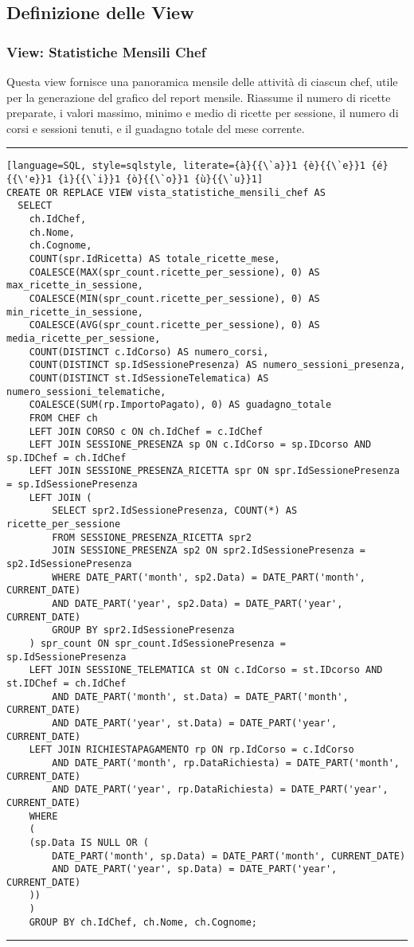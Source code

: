 \subsection{Definizione delle View}

\subsubsection{View: Statistiche Mensili Chef}

Questa view fornisce una panoramica mensile delle attività di ciascun chef, utile per la generazione del grafico del report mensile. Riassume il numero di ricette preparate, i valori massimo, minimo e medio di ricette per sessione, il numero di corsi e sessioni tenuti, e il guadagno totale del mese corrente.

\noindent\rule{\textwidth}{0.4pt}
\begin{lstlisting}[language=SQL, style=sqlstyle, literate={à}{{\`a}}1 {è}{{\`e}}1 {é}{{\'e}}1 {ì}{{\`i}}1 {ò}{{\`o}}1 {ù}{{\`u}}1]
CREATE OR REPLACE VIEW vista_statistiche_mensili_chef AS
  SELECT
    ch.IdChef,
    ch.Nome,
    ch.Cognome,
    COUNT(spr.IdRicetta) AS totale_ricette_mese,
    COALESCE(MAX(spr_count.ricette_per_sessione), 0) AS max_ricette_in_sessione,
    COALESCE(MIN(spr_count.ricette_per_sessione), 0) AS min_ricette_in_sessione,
    COALESCE(AVG(spr_count.ricette_per_sessione), 0) AS media_ricette_per_sessione,
    COUNT(DISTINCT c.IdCorso) AS numero_corsi,
    COUNT(DISTINCT sp.IdSessionePresenza) AS numero_sessioni_presenza,
    COUNT(DISTINCT st.IdSessioneTelematica) AS numero_sessioni_telematiche,
    COALESCE(SUM(rp.ImportoPagato), 0) AS guadagno_totale
    FROM CHEF ch
    LEFT JOIN CORSO c ON ch.IdChef = c.IdChef
    LEFT JOIN SESSIONE_PRESENZA sp ON c.IdCorso = sp.IDcorso AND sp.IDChef = ch.IdChef
    LEFT JOIN SESSIONE_PRESENZA_RICETTA spr ON spr.IdSessionePresenza = sp.IdSessionePresenza
    LEFT JOIN (
        SELECT spr2.IdSessionePresenza, COUNT(*) AS ricette_per_sessione
        FROM SESSIONE_PRESENZA_RICETTA spr2
        JOIN SESSIONE_PRESENZA sp2 ON spr2.IdSessionePresenza = sp2.IdSessionePresenza
        WHERE DATE_PART('month', sp2.Data) = DATE_PART('month', CURRENT_DATE)
        AND DATE_PART('year', sp2.Data) = DATE_PART('year', CURRENT_DATE)
        GROUP BY spr2.IdSessionePresenza
    ) spr_count ON spr_count.IdSessionePresenza = sp.IdSessionePresenza
    LEFT JOIN SESSIONE_TELEMATICA st ON c.IdCorso = st.IDcorso AND st.IDChef = ch.IdChef
        AND DATE_PART('month', st.Data) = DATE_PART('month', CURRENT_DATE)
        AND DATE_PART('year', st.Data) = DATE_PART('year', CURRENT_DATE)
    LEFT JOIN RICHIESTAPAGAMENTO rp ON rp.IdCorso = c.IdCorso
        AND DATE_PART('month', rp.DataRichiesta) = DATE_PART('month', CURRENT_DATE)
        AND DATE_PART('year', rp.DataRichiesta) = DATE_PART('year', CURRENT_DATE)
    WHERE
    (
    (sp.Data IS NULL OR (
        DATE_PART('month', sp.Data) = DATE_PART('month', CURRENT_DATE)
        AND DATE_PART('year', sp.Data) = DATE_PART('year', CURRENT_DATE)
    ))
    )
    GROUP BY ch.IdChef, ch.Nome, ch.Cognome;
\end{lstlisting}
\noindent\rule{\textwidth}{0.4pt}

